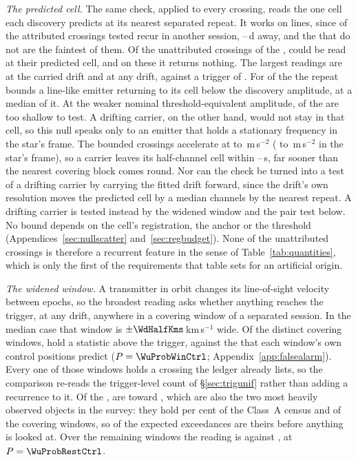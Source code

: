 \emph{The predicted cell.} The same check, applied to every crossing, reads
the one cell each discovery predicts at its nearest separated repeat. It
works on lines, since \MkAttrRecur{} of the \MkAttrTested{} attributed
crossings tested recur in another session, \QcSepMinD--\QcSepMaxD\,d away, and the
\MkAttrExcl{} that do not are the faintest of them. Of the
\MkUnattr{} unattributed crossings of the \NtSetUnName, \RcNExclPoss{} could
be read at their predicted cell, and on these it
returns nothing. The
largest readings are \RcTMatched{} at the carried drift and \RcTMax{} at any
drift, against a trigger of \StageNullTrig. For \RcNFracBelow{} of the
\RcNExcl{} the repeat bounds a line-like emitter returning to its cell
below the discovery amplitude, at a median \RcFracMed{} of it. At the
weaker nominal threshold-equivalent amplitude, \HjNPowerLo{} of the
\RcNExcl{} are too shallow to test. A drifting
carrier, on the other hand, would not stay in that cell, so this null speaks
only to an emitter that holds a stationary frequency in the star's frame. The
bounded crossings accelerate at \ZtALosLo{} to \ZtALosHi\,m\,s$^{-2}$
(\EgExStarALosLo{} to \EgStarALosHi\,m\,s$^{-2}$ in the star's frame), so a
carrier leaves its half-channel cell within \ZtLeaveSecLo--\ZtLeaveSecHi\,s,
far sooner than the nearest covering block comes round. Nor can the check be turned into a test of a
drifting carrier by carrying the fitted drift forward, since the drift's own
resolution moves the predicted cell by a median \ZtRegChanMed{} channels by
the nearest repeat. A drifting carrier is tested instead by the widened
window and the pair test below. No bound depends on the
cell's registration, the anchor or the threshold
(Appendices~\ref{sec:nullscatter} and~\ref{sec:regbudget}).\RcNoRepeatSentence{} None of the unattributed crossings is therefore a recurrent
feature in the sense of Table~\ref{tab:quantities}, which is only the first
of the requirements that table sets for an artificial origin.

\emph{The widened window.} A transmitter in orbit changes its line-of-sight
velocity between epochs, so the broadest reading asks whether anything
reaches the trigger, at any drift, anywhere in a covering window of a
separated session. In the median case that window is
$\pm\WdHalfKms$\,km\,s$^{-1}$ wide. Of the \WuNWin{} distinct covering
windows, \WuNWinExc{} hold a statistic above the trigger, against the
\WuExpWinCtrl{} that each window's own control positions predict
($P=\WuProbWinCtrl$; Appendix~\ref{app:falsealarm}). Every one of those
windows holds a crossing the ledger already lists, so the comparison
re-reads the trigger-level count of \S\ref{sec:trigunif} rather than adding
a recurrence to it. Of the \WuNWinExc, \WuNWinExcTwo{} are toward
\WuTwoStars, which are also the two most heavily observed objects in the
survey: they hold \TwWinASharePct{} per cent of the Class~A census and
\TwNWinTwo{} of the \WuNWin{} covering windows, so \TwExpTwoCtrl{} of the
\WuExpWinCtrl{} expected exceedances are theirs before anything is looked
at. Over the remaining \WuNWinRest{} windows the reading is
\WuNWinRestExc{} against \WuExpRestCtrl, at $P=\WuProbRestCtrl$.

